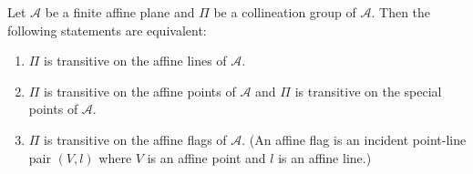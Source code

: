 Let $\mathcal{A}$ be a finite affine plane and $\Pi$ be a collineation group of $\mathcal{A}$. Then the following statements are equivalent:

\begin{enumerate}
\item[(i)] $\Pi$ is transitive on the affine lines of $\mathcal{A}$.
\item[(ii)] $\Pi$ is transitive on the affine points of $\mathcal{A}$ and $\Pi$ is transitive on the special points of $\mathcal{A}$.
\item[(iii)] $\Pi$ is transitive on the affine flags of $\mathcal{A}$. (An affine flag is an incident point-line pair $(V, l)$ where $V$ is an affine point and $l$ is an affine line.)
\end{enumerate}
